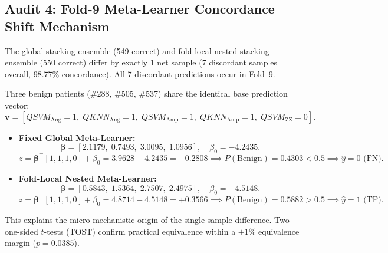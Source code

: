 \subsection{Audit 4: Fold-9 Meta-Learner Concordance Shift Mechanism}
The global stacking ensemble (549 correct) and fold-local nested stacking ensemble (550 correct) differ by exactly 1 net sample (7 discordant samples overall, 98.77\% concordance). All 7 discordant predictions occur in Fold~9.

Three benign patients (\#288, \#505, \#537) share the identical base prediction vector:
\begin{equation}
\mathbf{v} = [QSVM_{\mathrm{Ang}}=1, \; QKNN_{\mathrm{Ang}}=1, \; QSVM_{\mathrm{Amp}}=1, \; QKNN_{\mathrm{Amp}}=1, \; QSVM_{\mathrm{ZZ}}=0].
\end{equation}

\begin{itemize}[leftmargin=*]
  \item \textbf{Fixed Global Meta-Learner:}
  \begin{equation}
  \boldsymbol{\beta} = [2.1179, \; 0.7493, \; 3.0095, \; 1.0956], \quad \beta_0 = -4.2435.
  \end{equation}
  \begin{equation}
  z = \boldsymbol{\beta}^\top [1, 1, 1, 0] + \beta_0 = 3.9628 - 4.2435 = -0.2808 \implies P(\text{Benign}) = 0.4303 < 0.5 \implies \hat{y} = 0 \text{ (FN)}.
  \end{equation}
  \item \textbf{Fold-Local Nested Meta-Learner:}
  \begin{equation}
  \boldsymbol{\beta} = [0.5843, \; 1.5364, \; 2.7507, \; 2.4975], \quad \beta_0 = -4.5148.
  \end{equation}
  \begin{equation}
  z = \boldsymbol{\beta}^\top [1, 1, 1, 0] + \beta_0 = 4.8714 - 4.5148 = +0.3566 \implies P(\text{Benign}) = 0.5882 > 0.5 \implies \hat{y} = 1 \text{ (TP)}.
  \end{equation}
\end{itemize}
This explains the micro-mechanistic origin of the single-sample difference. Two-one-sided $t$-tests (TOST) confirm practical equivalence within a $\pm 1\%$ equivalence margin ($p = 0.0385$).
